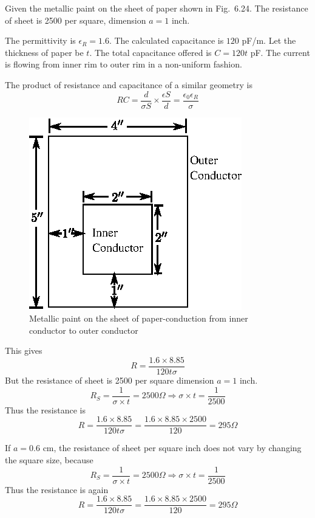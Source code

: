Given the metallic paint on the sheet of paper shown in Fig.~6.24. The resistance of sheet is 2500 per square, dimension $a=1$ inch.
\begin{itemize}
\begin{minipage}[c]{4.2cm}
\item[(a)] The permittivity is $\epsilon_{R}=1.6$. The calculated capacitance is $120$ pF/m. Let the thickness of paper be $t$. The total capacitance offered is $C=120t$ pF. The current is flowing from inner rim to outer rim in a non-uniform fashion.

The product of resistance and capacitance of a similar geometry is
$$
RC=\dfrac{d}{\sigma S}\times \dfrac{\epsilon S}{d}=\dfrac{\epsilon_{0}\epsilon_{R}}{\sigma}
$$
\end{minipage}
\qquad
\begin{minipage}[c]{5cm}
\begin{figure}[H]
\centering
\includegraphics{images/new-1.eps}
\caption{Metallic paint on the sheet of paper-conduction from inner conductor to outer conductor}
\end{figure}
\end{minipage}

This gives
$$
R=\dfrac{1.6\times 8.85}{120 t\sigma}
$$
But the resistance of sheet is 2500 per square dimension $a=1$ inch.
$$
R_{S}=\dfrac{1}{\sigma\times t}=2500\Omega \Rightarrow \sigma\times t=\dfrac{1}{2500}
$$
Thus the resistance is
$$
R=\dfrac{1.6\times 8.85}{120 t\sigma}=\dfrac{1.6\times 8.85\times 2500}{120}=295 \Omega
$$


\item[(b)] If $a=0.6$ cm, the resistance of sheet per square inch does not vary by changing the square size, because
$$
R_{S}=\dfrac{1}{\sigma\times t}=2500\Omega \Rightarrow \sigma\times t=\dfrac{1}{2500}
$$
Thus the resistance is again
$$
R=\dfrac{1.6\times 8.85}{120 t\sigma}=\dfrac{1.6\times 8.85\times 2500}{120}=295\Omega
$$
\end{itemize}

